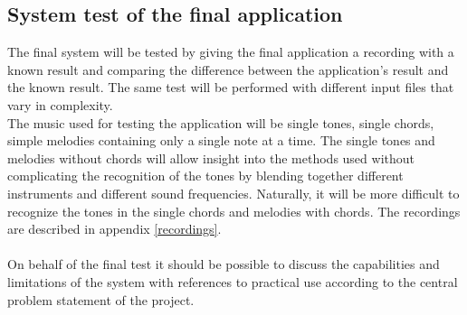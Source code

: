 \subsection{System test of the final application}
The final system will be tested by giving the final application a recording with a known result and comparing the difference between the application's result and the known result. The same test will be performed with different input files that vary in complexity.
\\
The music used for testing the application will be single tones, single chords, simple melodies containing only a single note at a time. The single tones and melodies without chords will allow insight into the methods used without complicating the recognition of the tones by blending together different instruments and different sound frequencies. Naturally, it will be more difficult to recognize the tones in the single chords and melodies with chords. The recordings are described in appendix \ref{recordings}. \\
\\
On behalf of the final test it should be possible to discuss the capabilities and limitations of the system with references to practical use according to the central problem statement of the project.  